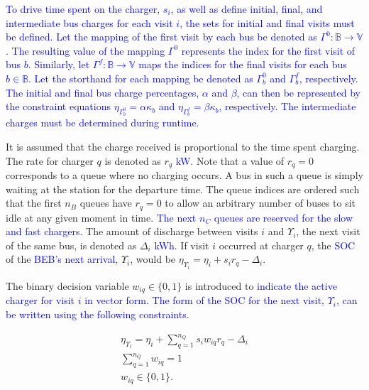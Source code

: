 \documentclass[utf8]{FrontiersinHarvard}
\begin{document}
\textcolor{blue}{To drive time spent on the charger, $s_i$, as well as define initial, final, and intermediate bus
  charges for each visit $i$, the sets for initial and final visits must be defined. Let the mapping of the first visit
  by each bus be denoted as $\Gamma^0 : \mathbb{B} \rightarrow \mathbb{V}$. The resulting value of the mapping
  $\Gamma^0$ represents the index for the first visit of bus $b$. Similarly, let $\Gamma^f : \mathbb{B} \rightarrow
  \mathbb{V}$ maps the indices for the final visits for each bus $b \in \mathbb{B}$. Let the storthand for each mapping
  be denoted as $\Gamma^0_b$ and $\Gamma^f_b$, respectively. The initial and final bus charge percentages, $\alpha$ and
  $\beta$, can then be represented by the constraint equations $\eta_{\Gamma^0_b} = \alpha \kappa_{b}$ and
  $\eta_{\Gamma^f_b} = \beta \kappa_{b}$, respectively. The intermediate charges must be determined during runtime.}

It is assumed that the charge received is proportional to the time spent charging. The rate for charger \(q\) is denoted
as \(r_q\) \textcolor{blue}{kW}. Note that a value of \(r_q = 0\) corresponds to a queue where no charging
occurs. A bus in such a queue is simply waiting at the station for the departure time. The queue indices are ordered
such that the first \(n_B\) queues have \(r_q = 0\) to allow an arbitrary number of buses to sit idle at any given moment in
time. \textcolor{blue}{The next $n_C$ queues are reserved for the slow and fast chargers.} The amount of
discharge between visits \(i\) and \(\Upsilon_i\), the next visit of the same bus, is denoted as \(\Delta_i\)
\textcolor{blue}{kWh}. If visit \(i\) occurred at charger \(q\), the \textcolor{blue}{SOC} of the
\textcolor{blue}{BEB's next arrival}, \(\Upsilon_i\), would be \(\eta_{\Upsilon_i} = \eta_i + s_i r_q - \Delta_i\).

The binary decision variable \(w_{iq} \in \{0,1\}\) is introduced to \textcolor{blue}{indicate the active charger for visit $i$ in vector form. The form of the SOC for the next visit, $\Upsilon_i$, can be written using the following constraints.}

\begin{subequations}
    \label{subeq:pre_next_charge}
\begin{align}
    \eta_{\Upsilon_i} = \eta_i + \sum_{q=1}^{n_Q} s_i w_{iq} r_q - \Delta_i \\
    \sum_{q=1}^{n_Q} w_{iq} = 1                           \\
    w_{iq} \in \{0,1\}.
\end{align}
\end{subequations}
\end{document}
